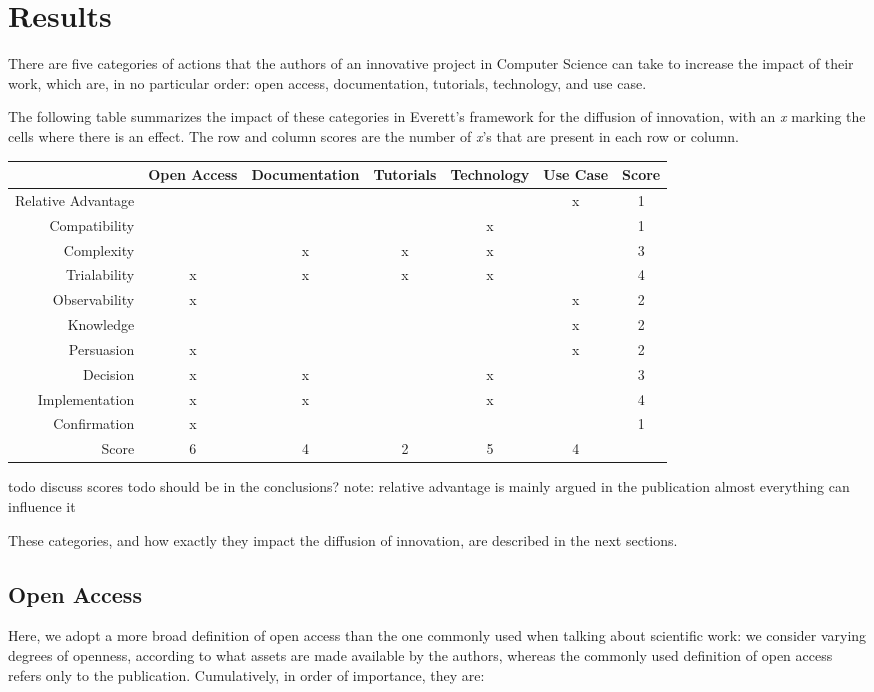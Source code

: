 \documentclass[12pt]{article}
\begin{document}
\section{Results}
\label{sec:orga576316}
There are five categories of actions that the authors of an innovative project in Computer Science can take to increase the impact of their work, which are, in no particular order: open access, documentation, tutorials, technology, and use case.

The following table summarizes the impact of these categories in Everett's framework for the diffusion of innovation, with an \emph{x} marking the cells where there is an effect. The row and column scores are the number of \emph{x}'s that are present in each row or column.


\begin{center}
\begin{tabular}{r|ccccc|c}
 & Open Access & Documentation & Tutorials & Technology & Use Case & Score\\
\hline
Relative Advantage &  &  &  &  & x & 1\\
Compatibility &  &  &  & x &  & 1\\
Complexity &  & x & x & x &  & 3\\
Trialability & x & x & x & x &  & 4\\
Observability & x &  &  &  & x & 2\\
\hline
Knowledge &  &  &  &  & x & 2\\
Persuasion & x &  &  &  & x & 2\\
Decision & x & x &  & x &  & 3\\
Implementation & x & x &  & x &  & 4\\
Confirmation & x &  &  &  &  & 1\\
\hline
Score & 6 & 4 & 2 & 5 & 4 & \\
\end{tabular}
\end{center}


todo discuss scores
todo should be in the conclusions?
note: relative advantage is mainly argued in the publication
almost everything can influence it

These categories, and how exactly they impact the diffusion of innovation, are described in the next sections.

\subsection{Open Access}
\label{sec:org7220ddd}
Here, we adopt a more broad definition of open access than the one commonly used when talking about scientific work: we consider varying degrees of openness, according to what assets are made available by the authors, whereas the commonly used definition of open access refers only to the publication. Cumulatively, in order of importance, they are:
\end{document}
